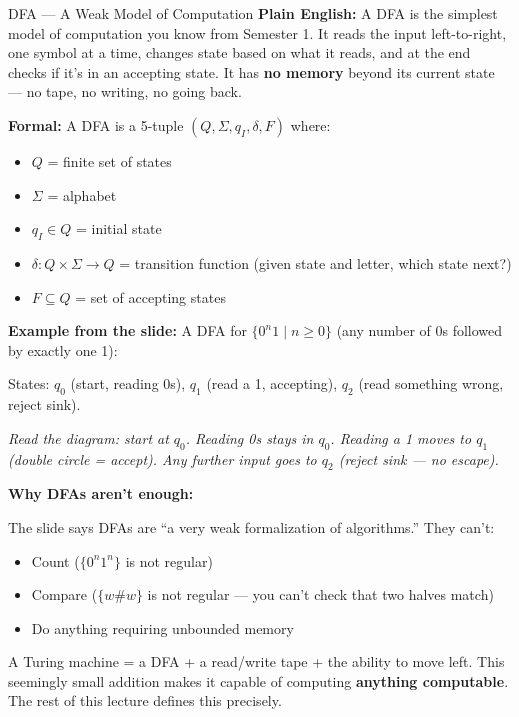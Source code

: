\documentclass[11pt,a4paper]{article}
\newcommand{\kt}[1]{\par\vspace{0.3em}\colorbox{yellow!60}{\parbox{\dimexpr\linewidth-2\fboxsep}{#1}}\vspace{0.3em}}
\begin{document}
\begin{definitionbox}{DFA --- A Weak Model of Computation}
\textbf{Plain English:} A DFA is the simplest model of computation you know from Semester 1. It reads the input left-to-right, one symbol at a time, changes state based on what it reads, and at the end checks if it's in an accepting state. It has \textbf{no memory} beyond its current state --- no tape, no writing, no going back.

\textbf{Formal:} A DFA is a 5-tuple $(Q, \Sigma, q_I, \delta, F)$ where:
\begin{itemize}[nosep]
\item $Q$ = finite set of states
\item $\Sigma$ = alphabet
\item $q_I \in Q$ = initial state
\item $\delta\colon Q \times \Sigma \to Q$ = transition function (given state and letter, which state next?)
\item $F \subseteq Q$ = set of accepting states
\end{itemize}

\textbf{Example from the slide:} A DFA for $\{0^n 1 \mid n \geq 0\}$ (any number of 0s followed by exactly one 1):

States: $q_0$ (start, reading 0s), $q_1$ (read a 1, accepting), $q_2$ (read something wrong, reject sink).

\begin{center}
\end{center}

\textit{Read the diagram: start at $q_0$. Reading 0s stays in $q_0$. Reading a 1 moves to $q_1$ (double circle = accept). Any further input goes to $q_2$ (reject sink --- no escape).}

\textbf{Why DFAs aren't enough:}

The slide says DFAs are ``a very weak formalization of algorithms.'' They can't:
\begin{itemize}[nosep]
\item Count ($\{0^n 1^n\}$ is not regular)
\item Compare ($\{w\#w\}$ is not regular --- you can't check that two halves match)
\item Do anything requiring unbounded memory
\end{itemize}

\kt{A Turing machine = a DFA + a read/write tape + the ability to move left. This seemingly small addition makes it capable of computing \textbf{anything computable}. The rest of this lecture defines this precisely.}
\end{definitionbox}
\end{document}
